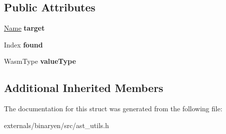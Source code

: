 \subsection*{Public Attributes}
\begin{DoxyCompactItemize}
\item 
\mbox{\label{structwasm_1_1_break_seeker_a960ef8984f3fabe76fc0f33ac2ed05b5}} 
\mbox{\hyperlink{structwasm_1_1_name}{Name}} {\bfseries target}
\item 
\mbox{\label{structwasm_1_1_break_seeker_a2fc5b64b5abadd15c833b9842aadc8f4}} 
Index {\bfseries found}
\item 
\mbox{\label{structwasm_1_1_break_seeker_a606830cad9d6ad7068558b0eed5ab762}} 
Wasm\+Type {\bfseries value\+Type}
\end{DoxyCompactItemize}
\subsection*{Additional Inherited Members}


The documentation for this struct was generated from the following file\+:\begin{DoxyCompactItemize}
\item 
externals/binaryen/src/ast\+\_\+utils.\+h\end{DoxyCompactItemize}
